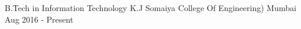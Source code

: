 

\begin{cventries}

  \cventry
    {B.Tech in Information Technology} %
    {K.J Somaiya College Of Engineering)} %
    {Mumbai} %
    {Aug 2016 - Present} %
    {
      
    }

\end{cventries}
